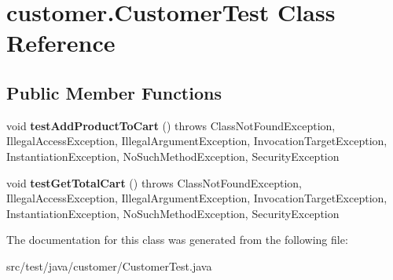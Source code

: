 \hypertarget{classcustomer_1_1_customer_test}{}\section{customer.\+Customer\+Test Class Reference}
\label{classcustomer_1_1_customer_test}
\subsection*{Public Member Functions}
\begin{DoxyCompactItemize}
\item 
\mbox{\label{classcustomer_1_1_customer_test_a2ce424afac93fabc7c82d408c6238ca1}} 
void {\bfseries test\+Add\+Product\+To\+Cart} ()  throws Class\+Not\+Found\+Exception,     Illegal\+Access\+Exception, Illegal\+Argument\+Exception,     Invocation\+Target\+Exception, Instantiation\+Exception,     No\+Such\+Method\+Exception, Security\+Exception 
\item 
\mbox{\label{classcustomer_1_1_customer_test_aae68c9c91ef02d38887c7b7a1d3f88cc}} 
void {\bfseries test\+Get\+Total\+Cart} ()  throws Class\+Not\+Found\+Exception,     Illegal\+Access\+Exception, Illegal\+Argument\+Exception,     Invocation\+Target\+Exception, Instantiation\+Exception,     No\+Such\+Method\+Exception, Security\+Exception 
\end{DoxyCompactItemize}


The documentation for this class was generated from the following file\+:\begin{DoxyCompactItemize}
\item 
src/test/java/customer/Customer\+Test.\+java\end{DoxyCompactItemize}
